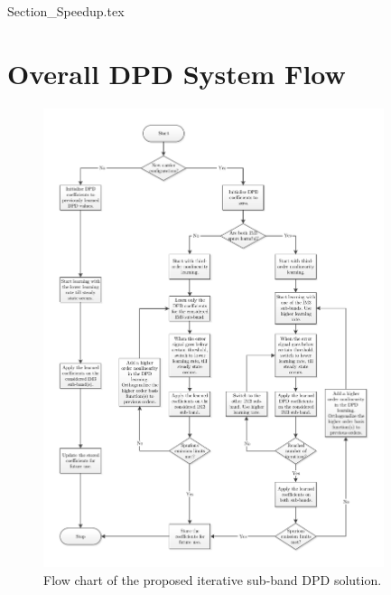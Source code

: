 {Section_Speedup.tex}

\section{Overall DPD System Flow}
\label{sec:SystemFlow}
\begin{figure}
	\centering
	\centerline{\includegraphics[width=0.89\textwidth]{./Figures/SystemFlowChart.pdf}}
	\caption[]{Flow chart of the proposed iterative sub-band DPD solution.}
	\label{fig:SystemFlowChart}
\end{figure}

